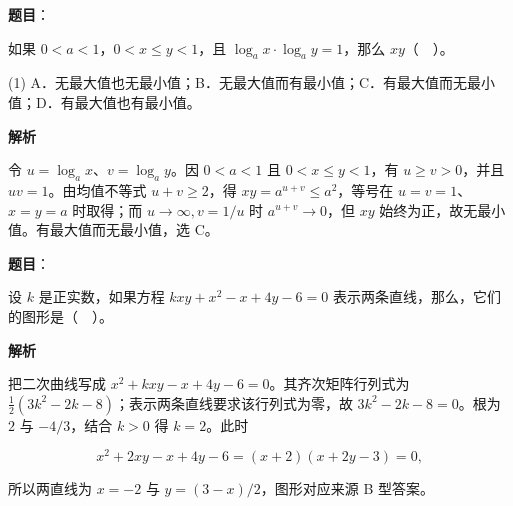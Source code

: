 \begin{answer}

\textbf{题目}：

如果 $0<a<1$，$0<x\le y<1$，且 $\log_ax\cdot\log_ay=1$，那么 $xy$（　）。

\begin{gkopts}(1)
\task A．无最大值也无最小值；B．无最大值而有最小值；C．有最大值而无最小值；D．有最大值也有最小值。
\end{gkopts}

\textbf{解析}

令 $u=\log_ax$、$v=\log_ay$。因 $0<a<1$ 且 $0<x\le y<1$，有 $u\ge v>0$，并且 $uv=1$。由均值不等式 $u+v\ge2$，得 $xy=a^{u+v}\le a^2$，等号在 $u=v=1$、$x=y=a$ 时取得；而 $u\to\infty,v=1/u$ 时 $a^{u+v}\to0$，但 $xy$ 始终为正，故无最小值。有最大值而无最小值，选 C。


\end{answer}
\begin{answer}

\textbf{题目}：

设 $k$ 是正实数，如果方程 $kxy+x^2-x+4y-6=0$ 表示两条直线，那么，它们的图形是（　）。
\nopagebreak[4]
\begin{center}\end{center}
\nopagebreak[4]
\textbf{解析}

把二次曲线写成 $x^2+kxy-x+4y-6=0$。其齐次矩阵行列式为 $\frac12(3k^2-2k-8)$；表示两条直线要求该行列式为零，故 $3k^2-2k-8=0$。根为 $2$ 与 $-4/3$，结合 $k>0$ 得 $k=2$。此时

\nopagebreak[4]
\[x^2+2xy-x+4y-6=(x+2)(x+2y-3)=0,\]

所以两直线为 $x=-2$ 与 $y=(3-x)/2$，图形对应来源 B 型答案。


\end{answer}
